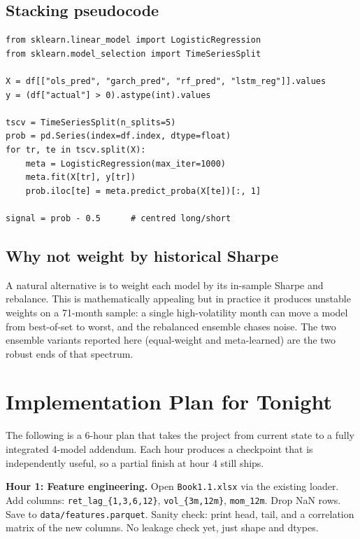 \documentclass[11pt,letterpaper]{article}
\begin{document}
\subsection{Stacking pseudocode}

\begin{lstlisting}
from sklearn.linear_model import LogisticRegression
from sklearn.model_selection import TimeSeriesSplit

X = df[["ols_pred", "garch_pred", "rf_pred", "lstm_reg"]].values
y = (df["actual"] > 0).astype(int).values

tscv = TimeSeriesSplit(n_splits=5)
prob = pd.Series(index=df.index, dtype=float)
for tr, te in tscv.split(X):
    meta = LogisticRegression(max_iter=1000)
    meta.fit(X[tr], y[tr])
    prob.iloc[te] = meta.predict_proba(X[te])[:, 1]

signal = prob - 0.5      # centred long/short
\end{lstlisting}

\subsection{Why not weight by historical Sharpe}

A natural alternative is to weight each model by its in-sample Sharpe and rebalance. This is mathematically appealing but in practice it produces unstable weights on a 71-month sample: a single high-volatility month can move a model from best-of-set to worst, and the rebalanced ensemble chases noise. The two ensemble variants reported here (equal-weight and meta-learned) are the two robust ends of that spectrum.

\section{Implementation Plan for Tonight}

The following is a 6-hour plan that takes the project from current state to a fully integrated 4-model addendum. Each hour produces a checkpoint that is independently useful, so a partial finish at hour 4 still ships.

\textbf{Hour 1: Feature engineering.} Open \texttt{Book1.1.xlsx} via the existing loader. Add columns: \texttt{ret\_lag\_\{1,3,6,12\}}, \texttt{vol\_\{3m,12m\}}, \texttt{mom\_12m}. Drop NaN rows. Save to \texttt{data/features.parquet}. Sanity check: print head, tail, and a correlation matrix of the new columns. No leakage check yet, just shape and dtypes.
\end{document}
